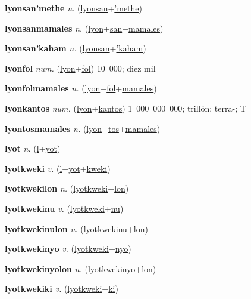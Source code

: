 \textbf{\hypertarget{lyonsan'methe}{lyonsan'methe}} \textit{n.} (\hyperlink{lyonsan}{lyonsan}+\allowbreak \hyperlink{'methe}{'methe})


\textbf{\hypertarget{lyonsanmamales}{lyonsanmamales}} \textit{n.} (\hyperlink{lyon}{lyon}+\allowbreak \hyperlink{san}{san}+\allowbreak \hyperlink{mamales}{mamales})


\textbf{\hypertarget{lyonsan'kaham}{lyonsan'kaham}} \textit{n.} (\hyperlink{lyonsan}{lyonsan}+\allowbreak \hyperlink{'kaham}{'kaham})


\textbf{\hypertarget{lyonfol}{lyonfol}} \textit{num.} (\hyperlink{lyon}{lyon}+\allowbreak \hyperlink{fol}{fol})
10~000; diez mil

\textbf{\hypertarget{lyonfolmamales}{lyonfolmamales}} \textit{n.} (\hyperlink{lyon}{lyon}+\allowbreak \hyperlink{fol}{fol}+\allowbreak \hyperlink{mamales}{mamales})


\textbf{\hypertarget{lyonkantos}{lyonkantos}} \textit{num.} (\hyperlink{lyon}{lyon}+\allowbreak \hyperlink{kantos}{kantos})
1~000~000~000; trillón; terra-; T

\textbf{\hypertarget{lyontosmamales}{lyontosmamales}} \textit{n.} (\hyperlink{lyon}{lyon}+\allowbreak \hyperlink{tos}{tos}+\allowbreak \hyperlink{mamales}{mamales})


\textbf{\hypertarget{lyot}{lyot}} \textit{n.} (\hyperlink{l}{l}+\allowbreak \hyperlink{yot}{yot})


\textbf{\hypertarget{lyotkweki}{lyotkweki}} \textit{v.} (\hyperlink{l}{l}+\allowbreak \hyperlink{yot}{yot}+\allowbreak \hyperlink{kweki}{kweki})


\textbf{\hypertarget{lyotkwekilon}{lyotkwekilon}} \textit{n.} (\hyperlink{lyotkweki}{lyotkweki}+\allowbreak \hyperlink{lon}{lon})


\textbf{\hypertarget{lyotkwekinu}{lyotkwekinu}} \textit{v.} (\hyperlink{lyotkweki}{lyotkweki}+\allowbreak \hyperlink{nu}{nu})


\textbf{\hypertarget{lyotkwekinulon}{lyotkwekinulon}} \textit{n.} (\hyperlink{lyotkwekinu}{lyotkwekinu}+\allowbreak \hyperlink{lon}{lon})


\textbf{\hypertarget{lyotkwekinyo}{lyotkwekinyo}} \textit{v.} (\hyperlink{lyotkweki}{lyotkweki}+\allowbreak \hyperlink{nyo}{nyo})


\textbf{\hypertarget{lyotkwekinyolon}{lyotkwekinyolon}} \textit{n.} (\hyperlink{lyotkwekinyo}{lyotkwekinyo}+\allowbreak \hyperlink{lon}{lon})


\textbf{\hypertarget{lyotkwekiki}{lyotkwekiki}} \textit{v.} (\hyperlink{lyotkweki}{lyotkweki}+\allowbreak \hyperlink{ki}{ki})


